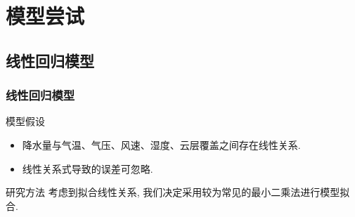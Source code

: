 \documentclass[10pt]{beamer}
\begin{document}
\section{模型尝试}
\subsection{线性回归模型}
\begin{frame}
	\frametitle{线性回归模型}
	\begin{block}{模型假设}
		\begin{itemize}
			\item 降水量与气温、气压、风速、湿度、云层覆盖之间存在线性关系.
			\item 线性关系式导致的误差可忽略.
		\end{itemize}
	\end{block}

	\begin{block}{研究方法}
		考虑到拟合线性关系, 我们决定采用较为常见的最小二乘法进行模型拟合.
	\end{block}
\end{frame}
\end{document}
